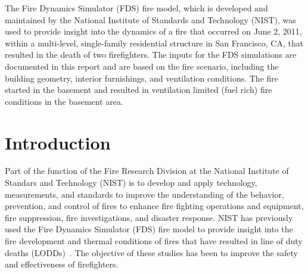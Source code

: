 \documentclass[12pt,oneside]{book}
\begin{document}
The Fire Dynamics Simulator (FDS) fire model, which is developed and maintained by the National Institute of Standards and Technology (NIST), was used to provide insight into the dynamics of a fire that occurred on June 2, 2011, within a multi-level, single-family residential structure in San Francisco, CA, that resulted in the death of two firefighters. The inputs for the FDS simulations are documented in this report and are based on the fire scenario, including the building geometry, interior furnishings, and ventilation conditions. The fire started in the basement and resulted in ventilation limited (fuel rich) fire conditions in the basement area.



\chapter{Introduction}
\label{sec:introduction}

Part of the function of the Fire Research Division at the National Institute of Standars and Technology (NIST) is to develop and apply technology, measurements, and standards to improve the understanding of the behavior, prevention, and control of fires to enhance fire fighting operations and equipment, fire suppression, fire investigations, and disaster response. NIST has previously used the Fire Dynamics Simulator (FDS) fire model to provide insight into the fire development and thermal conditions of fires that have resulted in line of duty deaths (LODDs)~\cite{Madrzykowski:1,Iowa,Texas,Bryner:Charleston,barowy:texas}. The objective of these studies has been to improve the safety and effectiveness of firefighters.
\end{document}
